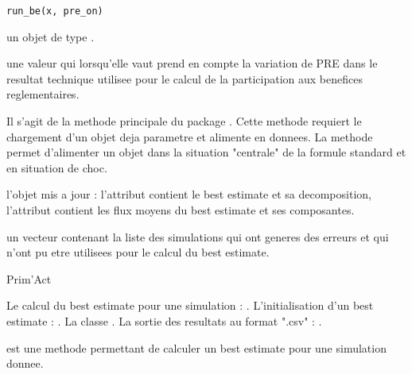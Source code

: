 \documentclass[a4paper]{book}
\begin{document}
%
\begin{Usage}
\begin{verbatim}
run_be(x, pre_on)
\end{verbatim}
\end{Usage}
%
\begin{Arguments}
\begin{ldescription}
\item[\code{x}] un objet de type .

\item[\code{pre\_on}] une valeur  qui lorsqu'elle vaut  prend en compte la variation
de PRE dans le resultat technique utilisee pour le calcul de la participation aux benefices reglementaires.
\end{ldescription}
\end{Arguments}
%
\begin{Details}\relax
Il s'agit de la methode principale du package . Cette methode requiert le chargement
d'un objet  deja parametre et alimente en donnees. La methode 
permet d'alimenter un objet  dans la situation "centrale" de la formule standard et en situation
de choc.
\end{Details}
%
\begin{Value}
 l'objet  mis a jour : l'attribut  contient le best estimate et sa
decomposition, l'attribut  contient les flux moyens du best estimate et ses
composantes.

 un vecteur contenant la liste des simulations qui ont generes des erreurs et qui n'ont pu
etre utilisees pour le calcul du best estimate.
\end{Value}
%
\begin{Author}\relax
Prim'Act
\end{Author}
%
\begin{SeeAlso}\relax
Le calcul du best estimate pour une simulation : .
L'initialisation d'un best estimate : .
La classe .
La sortie des resultats au format ".csv" : .
\end{SeeAlso}
%
\begin{Description}\relax
{} est une methode permettant de calculer un best estimate
pour une simulation donnee.
\end{Description}
\end{document}
